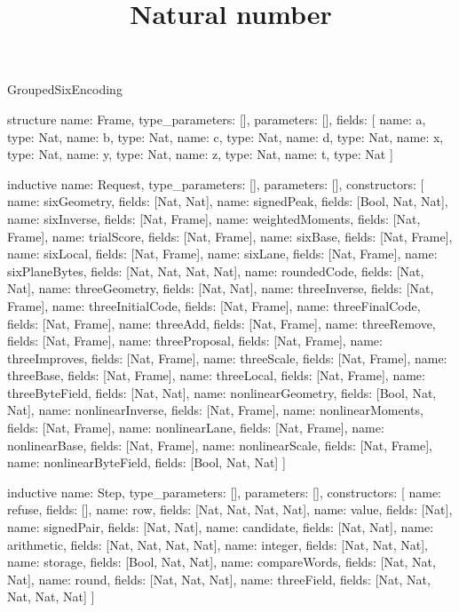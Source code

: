 \begin{lexlean}{GroupedSixEncoding}
\title{Natural number}
\begin{semanticmodule}
structure{
  name: Frame,
  type_parameters: [],
  parameters: [],
  fields: [
    {name: a, type: Nat},
    {name: b, type: Nat},
    {name: c, type: Nat},
    {name: d, type: Nat},
    {name: x, type: Nat},
    {name: y, type: Nat},
    {name: z, type: Nat},
    {name: t, type: Nat}
  ]
}

inductive{
  name: Request,
  type_parameters: [],
  parameters: [],
  constructors: [
    {name: sixGeometry, fields: [Nat, Nat]},
    {name: signedPeak, fields: [Bool, Nat, Nat]},
    {name: sixInverse, fields: [Nat, Frame]},
    {name: weightedMoments, fields: [Nat, Frame]},
    {name: trialScore, fields: [Nat, Frame]},
    {name: sixBase, fields: [Nat, Frame]},
    {name: sixLocal, fields: [Nat, Frame]},
    {name: sixLane, fields: [Nat, Frame]},
    {name: sixPlaneBytes, fields: [Nat, Nat, Nat, Nat]},
    {name: roundedCode, fields: [Nat, Nat]},
    {name: threeGeometry, fields: [Nat, Nat]},
    {name: threeInverse, fields: [Nat, Frame]},
    {name: threeInitialCode, fields: [Nat, Frame]},
    {name: threeFinalCode, fields: [Nat, Frame]},
    {name: threeAdd, fields: [Nat, Frame]},
    {name: threeRemove, fields: [Nat, Frame]},
    {name: threeProposal, fields: [Nat, Frame]},
    {name: threeImproves, fields: [Nat, Frame]},
    {name: threeScale, fields: [Nat, Frame]},
    {name: threeBase, fields: [Nat, Frame]},
    {name: threeLocal, fields: [Nat, Frame]},
    {name: threeByteField, fields: [Nat, Nat]},
    {name: nonlinearGeometry, fields: [Bool, Nat, Nat]},
    {name: nonlinearInverse, fields: [Nat, Frame]},
    {name: nonlinearMoments, fields: [Nat, Frame]},
    {name: nonlinearLane, fields: [Nat, Frame]},
    {name: nonlinearBase, fields: [Nat, Frame]},
    {name: nonlinearScale, fields: [Nat, Frame]},
    {name: nonlinearByteField, fields: [Bool, Nat, Nat]}
  ]
}

inductive{
  name: Step,
  type_parameters: [],
  parameters: [],
  constructors: [
    {name: refuse, fields: []},
    {name: row, fields: [Nat, Nat, Nat, Nat]},
    {name: value, fields: [Nat]},
    {name: signedPair, fields: [Nat, Nat]},
    {name: candidate, fields: [Nat, Nat]},
    {name: arithmetic, fields: [Nat, Nat, Nat, Nat]},
    {name: integer, fields: [Nat, Nat, Nat]},
    {name: storage, fields: [Bool, Nat, Nat]},
    {name: compareWords, fields: [Nat, Nat, Nat]},
    {name: round, fields: [Nat, Nat, Nat]},
    {name: threeField, fields: [Nat, Nat, Nat, Nat, Nat]}
  ]
}


\end{semanticmodule}
\end{lexlean}
